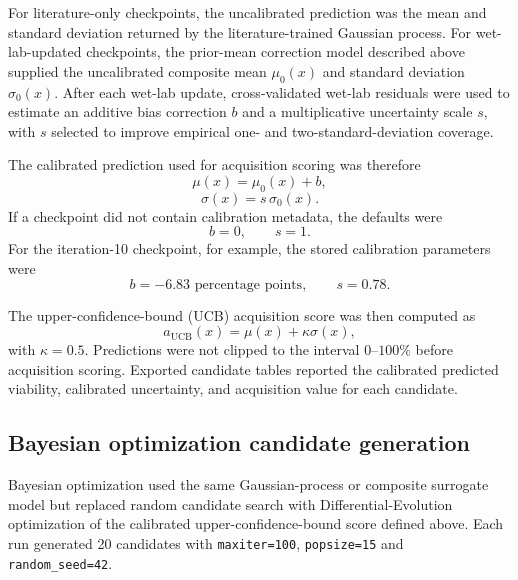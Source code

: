 \documentclass[preprint,12pt]{elsarticle}
\begin{document}
For literature-only checkpoints, the uncalibrated prediction was the mean and standard deviation returned by the literature-trained Gaussian process. For wet-lab-updated checkpoints, the prior-mean correction model described above supplied the uncalibrated composite mean \(\mu_{0}(x)\) and standard deviation \(\sigma_{0}(x)\). After each wet-lab update, cross-validated wet-lab residuals were used to estimate an additive bias correction \(b\) and a multiplicative uncertainty scale \(s\), with \(s\) selected to improve empirical one- and two-standard-deviation coverage.

The calibrated prediction used for acquisition scoring was therefore
\begin{equation}
\mu(x)=\mu_{0}(x)+b,
\end{equation}
\begin{equation}
\sigma(x)=s\,\sigma_{0}(x).
\end{equation}
If a checkpoint did not contain calibration metadata, the defaults were
\begin{equation}
b=0,
\qquad
s=1.
\end{equation}
For the iteration-10 checkpoint, for example, the stored calibration parameters were
\begin{equation}
b=-6.83 \text{ percentage points},
\qquad
s=0.78.
\end{equation}

The upper-confidence-bound (UCB) acquisition score was then computed as
\begin{equation}
a_{\mathrm{UCB}}(x)
=
\mu(x)+\kappa\sigma(x),
\end{equation}
with \(\kappa=0.5\). Predictions were not clipped to the interval $0$--$100\%$ before acquisition scoring. Exported candidate tables reported the calibrated predicted viability, calibrated uncertainty, and acquisition value for each candidate.

\subsection{Bayesian optimization candidate generation}

Bayesian optimization used the same Gaussian-process or composite surrogate model but replaced random candidate search with Differential-Evolution optimization of the calibrated upper-confidence-bound score defined above. Each run generated 20 candidates with \texttt{maxiter=100}, \texttt{popsize=15} and \texttt{random\_seed=42}.
\end{document}
